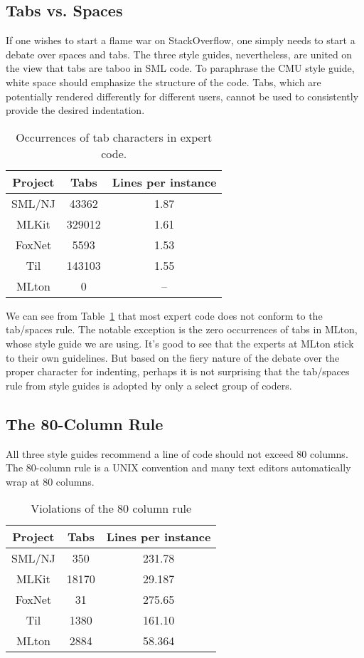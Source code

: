 \documentclass[12pt,abstracton]{scrartcl}
\begin{document}
\subsection{Tabs vs. Spaces}\label{subsec:tab}
If one wishes to start a flame war on StackOverflow, one simply needs to start
a debate over spaces and tabs. The three style guides, nevertheless, are
united on the view that tabs are taboo in SML code. To paraphrase the CMU
style guide, white space should emphasize the structure of the code.\cite{Cmu12}
Tabs, which are potentially rendered differently for
different users, cannot be used to consistently provide the desired indentation.
\begin{table}[h!]
\centering
\begin{tabular}{|c||c|c|}
\hline
Project & Tabs & Lines per instance \\ \hline\hline
SML/NJ & 43362 & 1.87 \\
MLKit & 329012 & 1.61 \\
FoxNet & 5593 & 1.53 \\
Til & 143103 & 1.55 \\
MLton & 0 & -- \\ \hline
\end{tabular}
\caption{Occurrences of tab characters in expert code.}
\label{table:tab}
\end{table}

We can see from Table~\ref{table:tab} that most expert code does
not conform to the tab/spaces rule. The notable exception is
the zero occurrences of tabs in MLton, whose style guide we are using.
It's good to see that the experts at MLton stick to their own guidelines.
But based on the fiery nature of the debate over the proper character
for indenting, perhaps it is not surprising that the tab/spaces
rule from style guides is adopted by only a select group of coders.
\subsection{The 80-Column Rule}\label{subsec:80}
All three style guides recommend a line of code should not exceed 80 columns.
The 80-column rule is a UNIX convention and many text editors automatically
wrap at 80 columns. \cite{Cmu12}
\begin{table}[h!]
\centering
\begin{tabular}{|c||c|c|}\hline
Project & Tabs & Lines per instance \\ \hline\hline
SML/NJ & 350 & 231.78 \\
MLKit & 18170 & 29.187 \\
FoxNet & 31 & 275.65 \\
Til & 1380 & 161.10 \\
MLton & 2884 & 58.364 \\ \hline
\end{tabular}
\caption{Violations of the 80 column rule}
\label{table:80}
\end{table}
\end{document}
